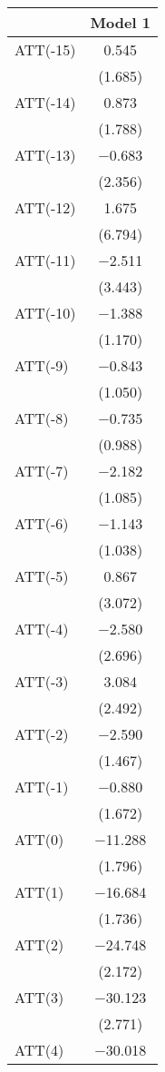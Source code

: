 \begin{table}
\centering
\footnotesize
\begin{tabular}[t]{lc}
\toprule
  & Model 1\\
\midrule
ATT(-15) & \num{0.545}\\
 & (\num{1.685})\\
ATT(-14) & \num{0.873}\\
 & (\num{1.788})\\
ATT(-13) & \num{-0.683}\\
 & (\num{2.356})\\
ATT(-12) & \num{1.675}\\
 & (\num{6.794})\\
ATT(-11) & \num{-2.511}\\
 & (\num{3.443})\\
ATT(-10) & \num{-1.388}\\
 & (\num{1.170})\\
ATT(-9) & \num{-0.843}\\
 & (\num{1.050})\\
ATT(-8) & \num{-0.735}\\
 & (\num{0.988})\\
ATT(-7) & \num{-2.182}\\
 & (\num{1.085})\\
ATT(-6) & \num{-1.143}\\
 & (\num{1.038})\\
ATT(-5) & \num{0.867}\\
 & (\num{3.072})\\
ATT(-4) & \num{-2.580}\\
 & (\num{2.696})\\
ATT(-3) & \num{3.084}\\
 & (\num{2.492})\\
ATT(-2) & \num{-2.590}\\
 & (\num{1.467})\\
ATT(-1) & \num{-0.880}\\
 & (\num{1.672})\\
ATT(0) & \num{-11.288}\\
 & (\num{1.796})\\
ATT(1) & \num{-16.684}\\
 & (\num{1.736})\\
ATT(2) & \num{-24.748}\\
 & (\num{2.172})\\
ATT(3) & \num{-30.123}\\
 & (\num{2.771})\\
ATT(4) & \num{-30.018}\\

\end{tabular}
\end{table}
